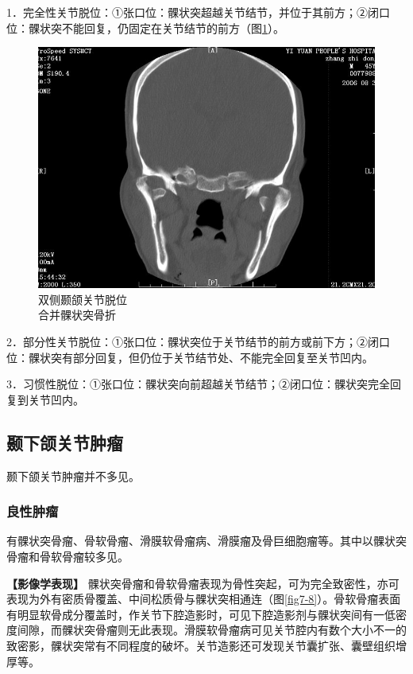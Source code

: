 1．完全性关节脱位：①张口位：髁状突超越关节结节，并位于其前方；②闭口位：髁状突不能回复，仍固定在关节结节的前方（图\ref{fig7-7}）。

\begin{figure}[!htbp]
 \centering
 \includegraphics[width=.7\textwidth,height=\textheight,keepaspectratio]{./images/Image00164.jpg}
 \captionsetup{justification=centering}
 \caption{双侧颞颌关节脱位\\{\small 合并髁状突骨折}}
 \label{fig7-7}
  \end{figure} 

2．部分性关节脱位：①张口位：髁状突位于关节结节的前方或前下方；②闭口位：髁状突有部分回复，但仍位于关节结节处、不能完全回复至关节凹内。

3．习惯性脱位：①张口位：髁状突向前超越关节结节；②闭口位：髁状突完全回复到关节凹内。

\subsection{颞下颌关节肿瘤}

颞下颌关节肿瘤并不多见。

\subsubsection{良性肿瘤}

有髁状突骨瘤、骨软骨瘤、滑膜软骨瘤病、滑膜瘤及骨巨细胞瘤等。其中以髁状突骨瘤和骨软骨瘤较多见。

\textbf{【影像学表现】}
髁状突骨瘤和骨软骨瘤表现为骨性突起，可为完全致密性，亦可表现为外有密质骨覆盖、中间松质骨与髁状突相通连（图\ref{fig7-8}）。骨软骨瘤表面有明显软骨成分覆盖时，作关节下腔造影时，可见下腔造影剂与髁状突间有一低密度间隙，而髁状突骨瘤则无此表现。滑膜软骨瘤病可见关节腔内有数个大小不一的致密影，髁状突常有不同程度的破坏。关节造影还可发现关节囊扩张、囊壁组织增厚等。

